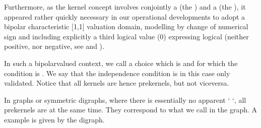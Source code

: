 \documentclass[a4paper,12pt,english]{sphinxhowto}
\begin{document}
\sphinxAtStartPar
Furthermore, as the kernel concept involves conjointly a  (the ) and a  (the ), it appeared rather quickly necessary in our operational developments to adopt a bipolar characteristic {[}\sphinxhyphen{}1,1{]} valuation domain, modelling  by change of numerical sign and including explicitly a third  logical value (0) expressing logical  (neither positive, nor negative, see  and ).

\sphinxAtStartPar
In such a  bipolar\sphinxhyphen{}valued context, we call  a choice which is  and for which the  condition is . We say that the independence condition is in this case only  validated. Notice that all kernels are hence prekernels, but not vice\sphinxhyphen{}versa.

\sphinxAtStartPar
In graphs or symmetric digraphs, where there is essentially no apparent ‘  ‘, all prekernels are    at the same time. They correspond to what we call  in the graph. A  example is given by the  digraph.
\end{document}
